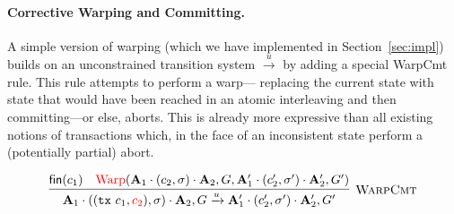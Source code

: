 
\paragraph{Corrective Warping and Committing.}
A simple version of warping (which we have implemented in
Section~\ref{sec:impl}) builds on an unconstrained transition system
$\xrightarrow{u}$ by adding a special {\sc WarpCmt} rule. This rule
attempts to perform a warp---
replacing the current state with state that would have been reached in
an atomic interleaving and then committing---or else, aborts. This is
already more expressive than all existing notions of transactions
which, in the face of an inconsistent state perform a (potentially
partial) abort.


$$
\infer[\text{\sc WarpCmt}]{ 
  \As_1 \cdot ((\tx{c_1},\red{c_2}),\sigma) \cdot \As_2, G  \xrightarrow{u}
  \As'_1 \cdot (c'_2,\sigma') \cdot \As'_2, G'
}{
  \nothing{c_1} &
   \text{\red{Warp}}(  \As_1 \cdot (c_2,\sigma) \cdot \As_2, G,
  \As'_1 \cdot (c'_2,\sigma') \cdot \As'_2, G')
}
$$














